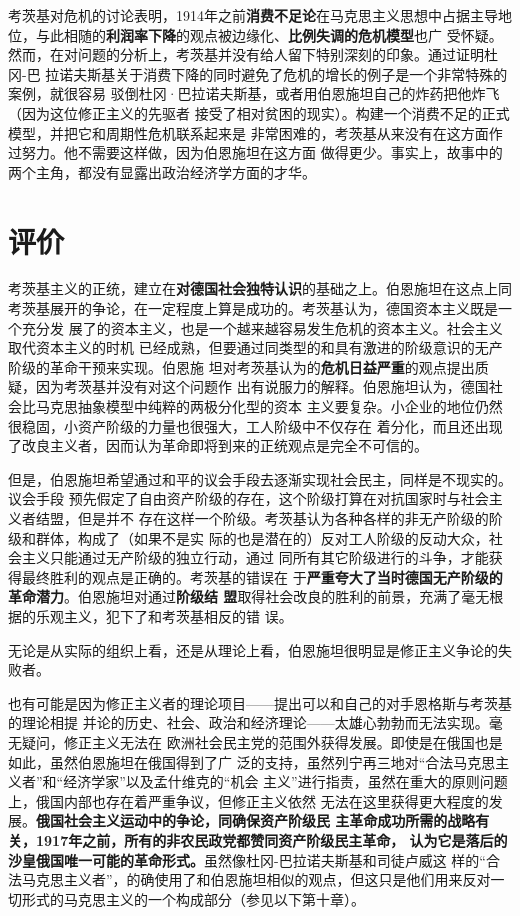 考茨基对危机的讨论表明，1914年之前\textbf{消费不足论}在马克思主义思想中占据主导地
位，与此相随的\textbf{利润率下降}的观点被边缘化、\textbf{比例失调的危机模型}也广
受怀疑。然而，在对问题的分析上，考茨基并没有给人留下特别深刻的印象。通过证明杜冈-巴
拉诺夫斯基关于消费下降的同时避免了危机的增长的例子是一个非常特殊的案例，就很容易
驳倒杜冈·巴拉诺夫斯基，或者用伯恩施坦自己的炸药把他炸飞（因为这位修正主义的先驱者
接受了相对贫困的现实）。构建一个消费不足的正式模型，并把它和周期性危机联系起来是
非常困难的，考茨基从来没有在这方面作过努力。他不需要这样做，因为伯恩施坦在这方面
做得更少。事实上，故事中的两个主角，都没有显露出政治经济学方面的才华。

\section{评价}
考茨基主义的正统，建立在\textbf{对德国社会独特认识}的基础之上。伯恩施坦在这点上同
考茨基展开的争论，在一定程度上算是成功的。考茨基认为，德国资本主义既是一个充分发
展了的资本主义，也是一个越来越容易发生危机的资本主义。社会主义取代资本主义的时机
已经成熟，但要通过同类型的和具有激进的阶级意识的无产阶级的革命干预来实现。伯恩施
坦对考茨基认为的\textbf{危机日益严重}的观点提出质疑，因为考茨基并没有对这个问题作
出有说服力的解释。伯恩施坦认为，德国社会比马克思抽象模型中纯粹的两极分化型的资本
主义要复杂。小企业的地位仍然很稳固，小资产阶级的力量也很强大，工人阶级中不仅存在
着分化，而且还出现了改良主义者，因而认为革命即将到来的正统观点是完全不可信的。

但是，伯恩施坦希望通过和平的议会手段去逐渐实现社会民主，同样是不现实的。议会手段
预先假定了自由资产阶级的存在，这个阶级打算在对抗国家时与社会主义者结盟，但是并不
存在这样一个阶级。考茨基认为各种各样的非无产阶级的阶级和群体，构成了（如果不是实
际的也是潜在的）反对工人阶级的反动大众，社会主义只能通过无产阶级的独立行动，通过
同所有其它阶级进行的斗争，才能获得最终胜利的观点是正确的。考茨基的错误在
于\textbf{严重夸大了当时德国无产阶级的革命潜力}。伯恩施坦对通过\textbf{阶级结
  盟}取得社会改良的胜利的前景，充满了毫无根据的乐观主义，犯下了和考茨基相反的错
误。

无论是从实际的组织上看，还是从理论上看，伯恩施坦很明显是修正主义争论的失败者。

也有可能是因为修正主义者的理论项目——提出可以和自己的对手恩格斯与考茨基的理论相提
并论的历史、社会、政治和经济理论——太雄心勃勃而无法实现。毫无疑问，修正主义无法在
欧洲社会民主党的范围外获得发展。即使是在俄国也是如此，虽然伯恩施坦在俄国得到了广
泛的支持，虽然列宁再三地对“合法马克思主义者”和“经济学家”以及孟什维克的“机会
主义”进行指责，虽然在重大的原则问题上，俄国内部也存在着严重争议，但修正主义依然
无法在这里获得更大程度的发展。\textbf{俄国社会主义运动中的争论，同确保资产阶级民
  主革命成功所需的战略有关，1917年之前，所有的非农民政党都赞同资产阶级民主革命，
  认为它是落后的沙皇俄国唯一可能的革命形式。}虽然像杜冈-巴拉诺夫斯基和司徒卢威这
样的“合法马克思主义者”，的确使用了和伯恩施坦相似的观点，但这只是他们用来反对一
切形式的马克思主义的一个构成部分（参见以下第十章）。

